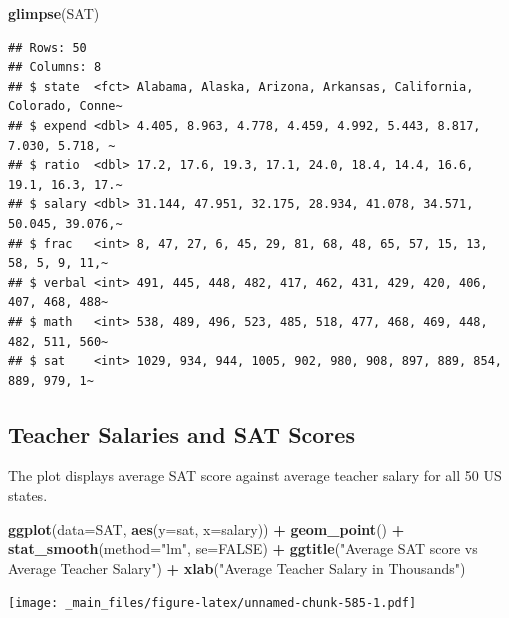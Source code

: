 \documentclass[]{book}
\newenvironment{Shaded}{\begin{snugshade}}{\end{snugshade}}
\newcommand{\KeywordTok}[1]{\textcolor[rgb]{0.13,0.29,0.53}{\textbf{#1}}}
\newcommand{\DataTypeTok}[1]{\textcolor[rgb]{0.13,0.29,0.53}{#1}}
\newcommand{\StringTok}[1]{\textcolor[rgb]{0.31,0.60,0.02}{#1}}
\newcommand{\OtherTok}[1]{\textcolor[rgb]{0.56,0.35,0.01}{#1}}
\newcommand{\OperatorTok}[1]{\textcolor[rgb]{0.81,0.36,0.00}{\textbf{#1}}}
\newcommand{\NormalTok}[1]{#1}
\begin{document}
\begin{Shaded}
\begin{Highlighting}[]
\KeywordTok{glimpse}\NormalTok{(SAT)}
\end{Highlighting}
\end{Shaded}

\begin{verbatim}
## Rows: 50
## Columns: 8
## $ state  <fct> Alabama, Alaska, Arizona, Arkansas, California, Colorado, Conne~
## $ expend <dbl> 4.405, 8.963, 4.778, 4.459, 4.992, 5.443, 8.817, 7.030, 5.718, ~
## $ ratio  <dbl> 17.2, 17.6, 19.3, 17.1, 24.0, 18.4, 14.4, 16.6, 19.1, 16.3, 17.~
## $ salary <dbl> 31.144, 47.951, 32.175, 28.934, 41.078, 34.571, 50.045, 39.076,~
## $ frac   <int> 8, 47, 27, 6, 45, 29, 81, 68, 48, 65, 57, 15, 13, 58, 5, 9, 11,~
## $ verbal <int> 491, 445, 448, 482, 417, 462, 431, 429, 420, 406, 407, 468, 488~
## $ math   <int> 538, 489, 496, 523, 485, 518, 477, 468, 469, 448, 482, 511, 560~
## $ sat    <int> 1029, 934, 944, 1005, 902, 980, 908, 897, 889, 854, 889, 979, 1~
\end{verbatim}

\subsection{Teacher Salaries and SAT
Scores}\label{teacher-salaries-and-sat-scores}

The plot displays average SAT score against average teacher salary for
all 50 US states.

\begin{Shaded}
\begin{Highlighting}[]
\KeywordTok{ggplot}\NormalTok{(}\DataTypeTok{data=}\NormalTok{SAT, }\KeywordTok{aes}\NormalTok{(}\DataTypeTok{y=}\NormalTok{sat, }\DataTypeTok{x=}\NormalTok{salary)) }\OperatorTok{+}\StringTok{ }\KeywordTok{geom_point}\NormalTok{() }\OperatorTok{+}
\StringTok{  }\KeywordTok{stat_smooth}\NormalTok{(}\DataTypeTok{method=}\StringTok{"lm"}\NormalTok{, }\DataTypeTok{se=}\OtherTok{FALSE}\NormalTok{) }\OperatorTok{+}\StringTok{ }
\StringTok{  }\KeywordTok{ggtitle}\NormalTok{(}\StringTok{"Average SAT score vs Average Teacher Salary"}\NormalTok{) }\OperatorTok{+}\StringTok{ }
\StringTok{  }\KeywordTok{xlab}\NormalTok{(}\StringTok{"Average Teacher Salary in Thousands"}\NormalTok{) }
\end{Highlighting}
\end{Shaded}

\texttt{[image: \_main\_files/figure-latex/unnamed-chunk-585-1.pdf]}
\end{document}
